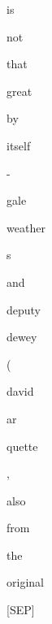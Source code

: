 \documentclass[varwidth=150mm]{standalone}
\begin{document}
\begin{CJK*}{UTF8}{gbsn}
{{{\colorbox{red!20.520631790161133}{\strut is} \colorbox{red!14.502691268920898}{\strut not} \colorbox{red!3.2160472869873047}{\strut that} \colorbox{red!2.8288495540618896}{\strut great} \colorbox{red!0.0}{\strut by} \colorbox{red!0.0}{\strut itself} \colorbox{red!32.69729995727539}{\strut -} \colorbox{red!3.6636765003204346}{\strut gale} \colorbox{red!0.0}{\strut weather}\colorbox{red!1.1690850257873535}{\strut s} \colorbox{red!1.5480735301971436}{\strut and} \colorbox{red!5.478722095489502}{\strut deputy} \colorbox{red!0.0}{\strut dewey} \colorbox{red!30.49099349975586}{\strut (} \colorbox{red!2.59138822555542}{\strut david} \colorbox{red!0.0}{\strut ar}\colorbox{red!5.805259704589844}{\strut quette} \colorbox{red!0.0}{\strut ,} \colorbox{red!3.067556619644165}{\strut also} \colorbox{red!12.849987983703613}{\strut from} \colorbox{red!14.895873069763184}{\strut the} \colorbox{red!13.483497619628906}{\strut original} \colorbox{red!8.2491455078125}{\strut [SEP]}
}}}
\end{CJK*}
\end{document}
